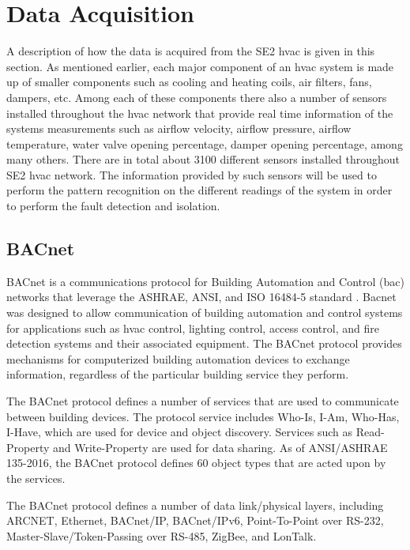 \section{Data Acquisition}
\label{section:dataAcquisition}

A description of how the data is acquired from the SE2 \gls{hvac} is given in this section. As mentioned earlier, each major component of an \gls{hvac} system is made up of smaller components such as cooling and heating coils, air filters, fans, dampers, etc. Among each of these components there also a number of sensors installed throughout the \gls{hvac} network that provide real time information of the systems measurements such as airflow velocity, airflow pressure, airflow temperature, water valve opening percentage, damper opening percentage, among many others. There are in total about 3100 different sensors installed throughout SE2 \gls{hvac} network. The information provided by such sensors will be used to perform the pattern recognition on the different readings of the system in order to perform the fault detection and isolation.

\subsection{BACnet}

BACnet is a communications protocol for Building Automation and Control (\gls{bac}) networks that leverage the ASHRAE, ANSI, and ISO 16484-5 standard \cite{bacnet_protocol}. Bacnet was designed to allow communication of building automation and control systems for applications such as \gls{hvac} control, lighting control, access control, and fire detection systems and their associated equipment. The BACnet protocol provides mechanisms for computerized building automation devices to exchange information, regardless of the particular building service they perform.

The BACnet protocol defines a number of services that are used to communicate between building devices. The protocol service includes Who-Is, I-Am, Who-Has, I-Have, which are used for device and object discovery. Services such as Read-Property and Write-Property are used for data sharing. As of ANSI/ASHRAE 135-2016, the BACnet protocol defines 60 object types that are acted upon by the services.

The BACnet protocol defines a number of data link/physical layers, including ARCNET, Ethernet, BACnet/IP, BACnet/IPv6, Point-To-Point over RS-232, Master-Slave/Token-Passing over RS-485, ZigBee, and LonTalk.

